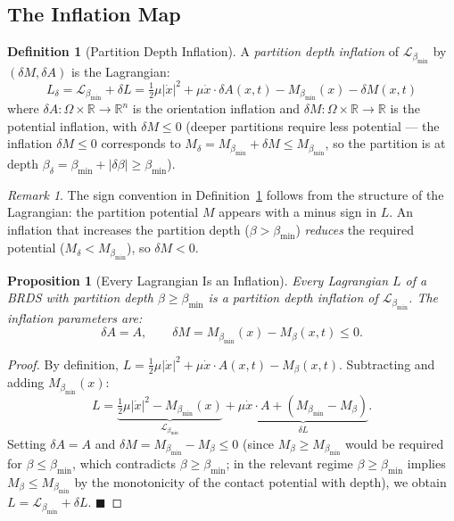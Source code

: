 \documentclass[11pt,twocolumn,a4paper]{article}
\theoremstyle{plain}
\newtheorem{proposition}[theorem]{Proposition}
\theoremstyle{definition}
\newtheorem{definition}[theorem]{Definition}
\theoremstyle{remark}
\newtheorem{remark}[theorem]{Remark}
\newcommand{\bmin}{\beta_{\min}}
\newcommand{\Lmin}{\mathcal{L}_{\bmin}}
\newcommand{\reals}{\mathbb{R}}
\newcommand{\half}{\tfrac{1}{2}}
\renewcommand{\qed}{\hfill$\blacksquare$}
\begin{document}
\subsection{The Inflation Map}

\begin{definition}[Partition Depth Inflation]
\label{def:inflation}
A \emph{partition depth inflation} of $\Lmin$ by $(\delta M, \delta A)$ is
the Lagrangian:
\[
  L_{\delta} = \Lmin + \delta L
             = \half\mu|\dot{x}|^2 + \mu\dot{x}\cdot\delta A(x,t)
               - M_{\bmin}(x) - \delta M(x,t)
\]
where $\delta A: \Omega \times \reals \to \reals^n$ is the orientation inflation
and $\delta M: \Omega \times \reals \to \reals$ is the potential inflation, with
$\delta M \leq 0$ (deeper partitions require less potential --- the inflation
$\delta M \leq 0$ corresponds to $M_\delta = M_{\bmin} + \delta M \leq M_{\bmin}$,
so the partition is at depth $\beta_\delta = \bmin + |\delta\beta| \geq \bmin$).
\end{definition}

\begin{remark}
The sign convention in Definition~\ref{def:inflation} follows from the structure
of the Lagrangian: the partition potential $M$ appears with a minus sign in $L$.
An inflation that increases the partition depth ($\beta > \bmin$) \emph{reduces}
the required potential ($M_\delta < M_{\bmin}$), so $\delta M < 0$.
\end{remark}

\begin{proposition}[Every Lagrangian Is an Inflation]
\label{prop:every_inflation}
Every Lagrangian $L$ of a BRDS with partition depth $\beta \geq \bmin$ is a
partition depth inflation of $\Lmin$. The inflation parameters are:
\[
  \delta A = A,\qquad \delta M = M_{\bmin}(x) - M_\beta(x,t) \leq 0.
\]
\end{proposition}

\begin{proof}
By definition, $L = \half\mu|\dot{x}|^2 + \mu\dot{x}\cdot A(x,t) - M_\beta(x,t)$.
Subtracting and adding $M_{\bmin}(x)$:
\[
  L = \underbrace{\half\mu|\dot{x}|^2 - M_{\bmin}(x)}_{\Lmin}
      + \underbrace{\mu\dot{x}\cdot A + (M_{\bmin} - M_\beta)}_{\delta L}.
\]
Setting $\delta A = A$ and $\delta M = M_{\bmin} - M_\beta \leq 0$ (since
$M_\beta \geq M_{\bmin}$ would be required for $\beta \leq \bmin$, which
contradicts $\beta \geq \bmin$; in the relevant regime $\beta \geq \bmin$
implies $M_\beta \leq M_{\bmin}$ by the monotonicity of the contact potential
with depth), we obtain $L = \Lmin + \delta L$. \qed
\end{proof}
\end{document}
